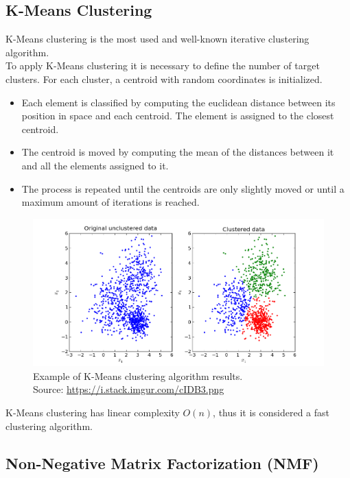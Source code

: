 \subsection{K-Means Clustering}

K-Means clustering is the most used and well-known iterative clustering algorithm.\\
To apply K-Means clustering it is necessary to define the number of target clusters. For each cluster, a centroid with random coordinates is initialized.
\begin{itemize}
\item Each element is classified by computing the euclidean distance between its position in space and each centroid. The element is assigned to the closest centroid.
\item The centroid is moved by computing the mean of the distances between it and all the elements assigned to it.
\item The process is repeated until the centroids are only slightly moved or until a maximum amount of iterations is reached.
\end{itemize}
\begin{figure}[htb]
\centering
\includegraphics[width=\textwidth]{pictures/k-means-clustering}
\caption{Example of K-Means clustering algorithm results.\\
Source: \url{https://i.stack.imgur.com/cIDB3.png}}
\end{figure}
K-Means clustering has linear complexity $O(n)$, thus it is considered a fast clustering algorithm.


\subsection{Non-Negative Matrix Factorization (NMF)}

